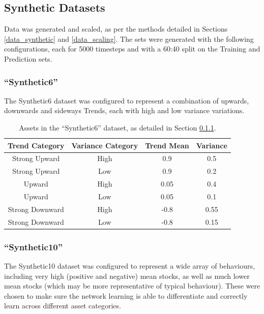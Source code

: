\documentclass[a4paper,11pt,oneside]{article}
\theoremstyle{plain}
\theoremstyle{definition}
\begin{document}
	
	
	\subsection{Synthetic Datasets}
	
	Data was generated and scaled, as per the methods detailed in Sections \ref{data_synthetic} and \ref{data_scaling}. The sets were generated with the following configurations, each for 5000 timesteps and with a 60:40 split on the Training and Prediction sets.
	
	\subsubsection{``Synthetic6''} \label{dataset_synthetic6}
	
	The Synthetic6 dataset was configured to represent a combination of upwards, downwards and sideways Trends, each with high and low variance variations.
	
	\begin{table}[h]
		\centering
		\small
		\begin{tabular}{|c|c|c|c|}
			\hline
			\textbf{Trend Category} &\textbf{Variance Category} & \textbf{Trend Mean} & \textbf{Variance}\\\hline	
			{Strong Upward} & {High} & {0.9} & {0.5} \\\hline
			{Strong Upward} & {Low} & {0.9} & {0.2} \\\hline
			{Upward} & {High} & {0.05} & {0.4} \\\hline
			{Upward} & {Low} & {0.05} & {0.1} \\\hline
			{Strong Downward} & {High} & {-0.8} & {0.55} \\\hline
			{Strong Downward} & {Low} & {-0.8} & {0.15} \\\hline
		\end{tabular}
		\newline\newline
		\caption{Assets in the ``Synthetic6'' dataset, as detailed in Section \ref{dataset_synthetic6}.}\label{tab_synth6}
	\end{table}
	
	\subsubsection{``Synthetic10''}\label{dataset_synthetic10}
	
	The Synthetic10 dataset was configured to represent a wide array of behaviours, including very high (positive and negative) mean stocks, as well as much lower mean stocks (which may be more representative of typical behaviour). These were chosen to make sure the network learning is able to differentiate and correctly learn across different asset categories.
	
\end{document}
